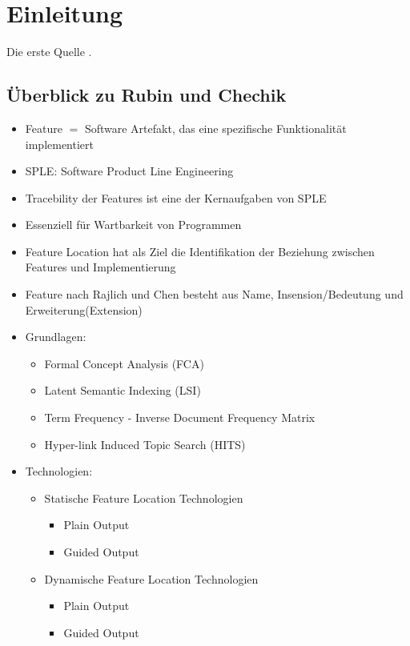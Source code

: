 \chapter{Einleitung}

Die erste Quelle \cite{survey}.

\section{Überblick  zu Rubin und Chechik}

\begin{itemize}
	\item Feature $=$ Software Artefakt, das eine spezifische Funktionalität implementiert
	\item SPLE: Software Product Line Engineering
	\item Tracebility der Features ist eine der Kernaufgaben von SPLE
	\item Essenziell für Wartbarkeit von Programmen
	\item Feature Location hat als Ziel die Identifikation der Beziehung zwischen Features und Implementierung
	\item Feature nach Rajlich und Chen besteht aus Name, Insension/Bedeutung und Erweiterung(Extension)
	\item Grundlagen:
	\begin{itemize}
		\item Formal Concept Analysis (FCA)
		\item Latent Semantic Indexing (LSI)
		\item Term Frequency - Inverse Document Frequency Matrix
		\item Hyper-link Induced Topic Search (HITS)
	\end{itemize}
	\item Technologien:
	\begin{itemize}
		\item Statische Feature Location Technologien
		\begin{itemize}
			\item Plain Output
			\item Guided Output
		\end{itemize}
		\item Dynamische Feature Location Technologien
		\begin{itemize}
			\item Plain Output
			\item Guided Output	
		\end{itemize}
	\end{itemize}
\end{itemize}


